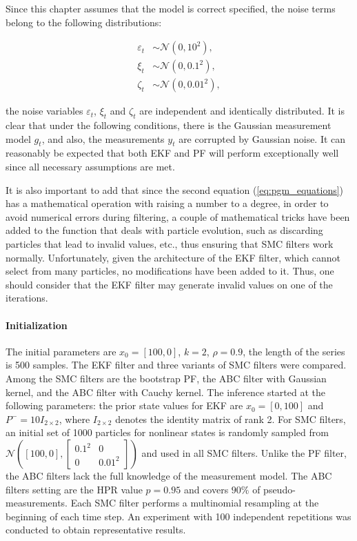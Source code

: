 Since this chapter assumes that the model is correct specified, the noise terms belong to the following distributions:

\begin{equation}
\begin{aligned}
\varepsilon_t &\sim \mathcal{N}(0, 10^2), \\
\xi_t &\sim \mathcal{N}(0, 0.1^2), \\
\zeta_t &\sim \mathcal{N}(0, 0.01^2),
\end{aligned}
\end{equation}

\noindent the noise variables \(\varepsilon_t\), \(\xi_t\) and \(\zeta_t\) are independent and identically distributed. It is clear that under the following conditions, there is the  Gaussian measurement model \(g_t\), and also, the measurements \(y_t\) are corrupted by Gaussian noise. It can reasonably be expected that both EKF and PF will perform exceptionally well since all necessary assumptions are met.

It is also important to add that since the second equation (\ref{eq:pgm_equations}) has a mathematical operation with raising a number to a degree, in order to avoid numerical errors during filtering, a couple of mathematical tricks have been added to the function that deals with particle evolution, such as discarding particles that lead to invalid values, etc., thus ensuring that SMC filters work normally. Unfortunately, given the architecture of the EKF filter, which cannot select from many particles, no modifications have been added to it. Thus, one should consider that the EKF filter may generate invalid values on one of the iterations.

\paragraph*{Initialization} The initial parameters are \(x_0=[100,0] \), \(k=2\), \(\rho=0.9\), the length of the series is 500 samples. The EKF filter and three variants of SMC filters were compared. Among the SMC filters are the bootstrap PF, the ABC filter with Gaussian kernel, and the ABC filter with Cauchy kernel. The inference started at the following parameters: the prior state values for EKF are \(x_0 = [0, 100]\) and \(P^{-} = 10 I_{2 \times 2} \), where \(I_{2 \times 2}\) denotes the identity matrix of rank 2. For SMC filters, an initial set of 1000 particles for nonlinear states is randomly sampled from \(\mathcal{N}([100,0],
\begin{bmatrix*}
0.1^2 & 0 \\
0 & 0.01^2
\end{bmatrix*}
) \) and used in all SMC filters. Unlike the PF filter, the ABC filters lack the full knowledge of the measurement model. The ABC filters setting are the HPR value \(p = 0.95\) and covers \(90\%\) of pseudo-measurements. Each SMC filter performs a multinomial resampling at the beginning of each time step. An experiment with 100 independent repetitions was conducted to obtain representative results.

